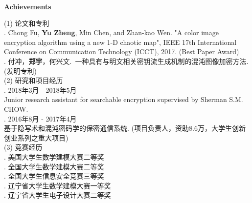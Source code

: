 \documentclass[a4paper,12pt,UTF8]{ctexart}
\newcommand{\rmnum}[1]{\romannumeral #1}
\begin{document}
\clearpage
{}
\begin{center}
	\LARGE\textbf{Achievements} 
\end{center}
(1) 论文和专利 
\\\indent\rmnum{1}. Chong Fu, \textbf{Yu Zheng}, Min Chen, and Zhan-kao Wen. "A color image encryption algorithm using a new 1-D chaotic map", IEEE 17th International Conference on Communication Technology (ICCT), 2017. (Best Paper Award)
\\\indent\rmnum{2}. 付冲，\textbf{郑宇}，何兴文.\ 一种具有与明文相关密钥流生成机制的混沌图像加密方法. (发明专利)
\\\indent(2) 研究和项目经历
\\\indent\rmnum{1}. 2018年3月 - 2018年5月
\\\indent Junior research assistant for searchable encryption supervised by Sherman S.M. CHOW.
\\\indent\rmnum{2}. 2016年8月 - 2017年4月
\\\indent 基于隐写术和混沌密码学的保密通信系统. (项目负责人，资助8.6万，大学生创新创业系列之重大项目)
\\\indent (3) 竞赛经历
\\\indent\rmnum{1}. 美国大学生数学建模大赛二等奖
\\\indent\rmnum{2}. 全国大学生数学建模大赛二等奖
\\\indent\rmnum{3}. 全国大学生信息安全竞赛三等奖
\\\indent\rmnum{4}. 辽宁省大学生数学建模大赛一等奖
\\\indent\rmnum{5}. 辽宁省大学生电子设计大赛二等奖
\end{document}
